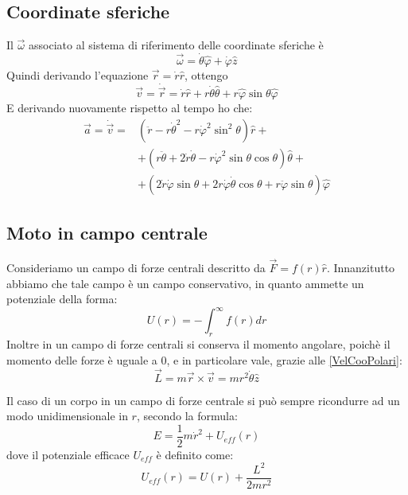 \documentclass[../main.tex]{subfiles}
\begin{document}
\subsection{Coordinate sferiche}
Il $\vec\omega$ associato al sistema di riferimento delle coordinate sferiche è
\begin{equation}\label{OmegaSferiche}
	\vec{\omega}=\dot{\theta}\hat{\varphi}+\dot{\varphi}\hat{z}
\end{equation}
Quindi derivando l'equazione $\vec{r}=\dot{r}\hat{r}$, ottengo
\begin{equation}\label{VelCooSferiche}
	\vec{v} =\dot{\vec{r}}=\dot{r}\hat{r}+r\dot{\theta}\hat{\theta}+r\hat{\varphi}\sin{\theta}\hat{\varphi}
\end{equation}
E derivando nuovamente rispetto al tempo ho che:
\begin{equation}\label{AccCooSferiche}
\begin{split}
	\vec{a}=	\dot{\vec{v}}=	&\left(\ddot{r}-r\dot{\theta}^2-r\dot{\varphi}^2\sin^2\theta \right)\hat{r}+\\
													&	+\left( r\ddot{\theta}+2\dot{r}\dot{\theta}-r\dot{\varphi}^2\sin\theta\cos\theta \right)\hat{\theta}+\\
													&	+\left( 2\dot{r}\dot{\varphi}\sin\theta+2r\dot{\varphi}\dot{\theta}\cos\theta+r\ddot{\varphi}\sin\theta \right)\hat{\varphi}
\end{split}
\end{equation}

\subsection{Moto in campo centrale}
Consideriamo un campo di forze centrali descritto da $\vec{F}=f(r)\hat{r}$. 
Innanzitutto abbiamo che tale campo è un campo conservativo, in quanto ammette un potenziale della forma:
\begin{equation*}
	U(r)=-\int_r^\infty{f(r) dr}
\end{equation*}
Inoltre in un campo di forze centrali si conserva il momento angolare, poichè il momento delle forze è uguale a 0,
e in particolare vale, grazie alle \cref{VelCooPolari}:
\begin{equation*}
	\vec{L}=m\vec{r}\times\vec{v}=mr^2\dot{\theta}\hat{z}
\end{equation*}

Il caso di un corpo in un campo di forze centrale si può sempre ricondurre ad un modo unidimensionale in $r$, secondo la formula:
\begin{equation}\label{CentraleUnidimensionale}
	E=\frac 12m\dot{r}^2+U_{eff}(r)
\end{equation}
dove il potenziale efficace $U_{eff}$ è definito come:
\begin{equation}\label{PotenzialeEfficace}
	U_{eff}(r)=U(r)+\frac{L^2}{2mr^2}
\end{equation}
\end{document}
